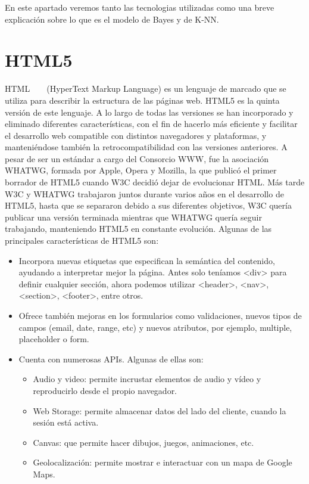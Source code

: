 \documentclass[a4paper, 12pt]{book}
\begin{document}
En este apartado veremos tanto las tecnologias utilizadas como una breve explicación sobre lo que es el modelo de Bayes y de K-NN.

\section{HTML5} 
\label{sec:html5}

HTML ~\cite{htmlw3} ~\cite{htmlwhat} (HyperText Markup Language) es un lenguaje de marcado que se utiliza para describir la estructura de las páginas web. HTML5 es la quinta versión de este lenguaje. A lo largo de todas las versiones se han incorporado y eliminado diferentes características, con el fin de hacerlo más eficiente y facilitar el desarrollo web compatible con distintos navegadores y plataformas, y manteniéndose también la retrocompatibilidad con las versiones anteriores.
A pesar de ser un estándar a cargo del Consorcio WWW, fue la asociación WHATWG, formada por Apple, Opera y Mozilla, la que publicó el primer borrador de HTML5 cuando W3C decidió dejar de evolucionar HTML. Más tarde W3C y WHATWG trabajaron juntos durante varios años en el desarrollo de HTML5, hasta que se separaron debido a sus diferentes objetivos, W3C quería publicar una versión terminada mientras que WHATWG quería seguir trabajando, manteniendo HTML5 en constante evolución.
Algunas de las principales características de HTML5 son:
\begin{itemize}
	\item Incorpora nuevas etiquetas que especifican la semántica del contenido, ayudando a interpretar mejor la página. Antes solo teníamos \textless{}div\textgreater{} para definir cualquier sección, ahora podemos utilizar \textless{}header\textgreater{}, \textless{}nav\textgreater{}, \textless{}section\textgreater{}, \textless{}footer\textgreater{}, entre otros.

	\item Ofrece también mejoras en los formularios como validaciones, nuevos tipos de campos (email, date, range, etc) y nuevos atributos, por ejemplo, multiple, placeholder o form.

	\item Cuenta con numerosas APIs. Algunas de ellas son:

	\begin{itemize}

		\item Audio y video: permite incrustar elementos de audio y vídeo y reproducirlo desde el propio navegador.

		\item Web Storage: permite almacenar datos del lado del cliente, cuando la sesión está activa.

        	\item Canvas: que permite hacer dibujos, juegos, animaciones, etc.

		\item Geolocalización: permite mostrar e interactuar con un mapa de Google Maps.

	\end{itemize}
\end{itemize}
\end{document}
